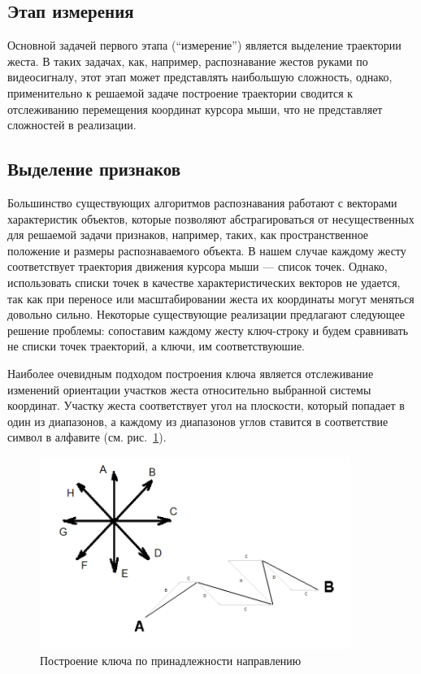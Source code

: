 \documentclass[a5paper]{article}
\begin{document}
\subsection{Этап измерения}
Основной задачей первого этапа (``измерение'') является выделение траектории жеста. В таких задачах, как, например, распознавание жестов руками по видеосигналу, этот этап может представлять наибольшую сложность, однако, применительно к решаемой задаче построение траектории сводится к отслеживанию перемещения координат курсора мыши, что не представляет сложностей в реализации. 

\subsection{Выделение признаков}

Большинство существующих алгоритмов распознавания работают с векторами характеристик объектов, которые позволяют абстрагироваться
от несущественных для решаемой задачи признаков, например, таких, как пространственное положение и размеры распознаваемого объекта. 
В нашем случае каждому жесту соответствует траектория движения курсора мыши --- список точек. Однако, использовать списки точек в качестве
характеристических векторов не удается, так как при переносе или масштабировании жеста их координаты могут меняться довольно сильно.
Некоторые существующие реализации предлагают следующее решение проблемы: сопоставим каждому жесту ключ-строку и будем сравнивать не 
списки точек траекторий, а ключи, им соответствуюшие.

Наиболее очевидным подходом построения ключа является отслеживание изменений ориентации участков жеста относительно выбранной системы координат. 
Участку жеста соответствует угол на плоскости, который попадает в один из диапазонов, а каждому из диапазонов 
углов ставится в соответствие символ в алфавите (см. рис.~\ref{chaos}). 

\begin{figure} [ht]
  \begin{center}
    \includegraphics[width=0.9\textwidth, bb=0 0 804 498]{02-chaos.png}
    \caption{Построение ключа по принадлежности направлению}
    \label{chaos}
  \end{center}
\end{figure}
\end{document}
